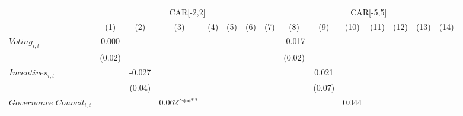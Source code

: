 {
\def\sym#1{\ifmmode^{#1}\else\(^{#1}\)\fi}
\begin{tabular}{l*{14}{c}}
\toprule
                    &\multicolumn{7}{c}{CAR[-2,2]}                                                                                                                            &\multicolumn{7}{c}{CAR[-5,5]}                                                                                                                            \\\cmidrule(lr){2-8}\cmidrule(lr){9-15}
                    &\multicolumn{1}{c}{(1)}         &\multicolumn{1}{c}{(2)}         &\multicolumn{1}{c}{(3)}         &\multicolumn{1}{c}{(4)}         &\multicolumn{1}{c}{(5)}         &\multicolumn{1}{c}{(6)}         &\multicolumn{1}{c}{(7)}         &\multicolumn{1}{c}{(8)}         &\multicolumn{1}{c}{(9)}         &\multicolumn{1}{c}{(10)}         &\multicolumn{1}{c}{(11)}         &\multicolumn{1}{c}{(12)}         &\multicolumn{1}{c}{(13)}         &\multicolumn{1}{c}{(14)}         \\
\midrule
$\textit{Voting}_{i,t}$&       0.000         &                     &                     &                     &                     &                     &                     &      -0.017         &                     &                     &                     &                     &                     &                     \\
                    &      (0.02)         &                     &                     &                     &                     &                     &                     &      (0.02)         &                     &                     &                     &                     &                     &                     \\
$\textit{Incentives}_{i,t}$&                     &      -0.027         &                     &                     &                     &                     &                     &                     &       0.021         &                     &                     &                     &                     &                     \\
                    &                     &      (0.04)         &                     &                     &                     &                     &                     &                     &      (0.07)         &                     &                     &                     &                     &                     \\
$\textit{Governance Council}_{i,t}$&                     &                     &       0.062\sym{**} &                     &                     &                     &                     &                     &                     &       0.044         &                     &                     &                     &                     \\

\end{tabular}}
